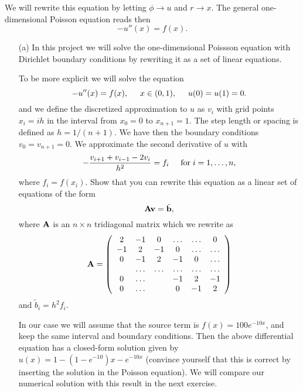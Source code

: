We will rewrite this equation by letting $\phi\rightarrow u$ and 
$r\rightarrow x$. 
The general one-dimensional Poisson equation reads then 
\[
-u''(x) = f(x).
\]


\begin{enumerate}
\item[(a)] 
In this project we will solve the one-dimensional Poissson equation
with Dirichlet boundary conditions by rewriting it as a set of linear equations.


To be more explicit we will solve the equation
\[
-u''(x) = f(x), \hspace{0.5cm} x\in(0,1), \hspace{0.5cm} u(0) = u(1) = 0.
\]
and we define the discretized approximation  to $u$ as $v_i$  with 
grid points $x_i=ih$   in the interval from $x_0=0$ to $x_{n+1}=1$.
The step length or spacing is defined as $h=1/(n+1)$. 
We have then the boundary conditions $v_0 = v_{n+1} = 0$.
We  approximate the second
derivative of $u$ with 
\[
   -\frac{v_{i+1}+v_{i-1}-2v_i}{h^2} = f_i  \hspace{0.5cm} \mathrm{for} \hspace{0.1cm} i=1,\dots, n,
\]
where $f_i=f(x_i)$.
Show that you can rewrite this equation as a linear set of equations of the form 
\[
   {\bf A}{\bf v} = \tilde{{\bf b}},
\]
where ${\bf A}$ is an $n\times n$  tridiagonal matrix which we rewrite as 
\begin{equation}
    {\bf A} = \left(\begin{array}{cccccc}
                           2& -1& 0 &\dots   & \dots &0 \\
                           -1 & 2 & -1 &0 &\dots &\dots \\
                           0&-1 &2 & -1 & 0 & \dots \\
                           & \dots   & \dots &\dots   &\dots & \dots \\
                           0&\dots   &  &-1 &2& -1 \\
                           0&\dots    &  & 0  &-1 & 2 \\
                      \end{array} \right)
\end{equation}
and $\tilde{b}_i=h^2f_i$.


In our case we will assume  that the source term is 
$f(x) = 100e^{-10x}$, and keep the same interval and boundary 
conditions. Then the above differential equation
has a closed-form  solution given by $u(x) = 1-(1-e^{-10})x-e^{-10x}$ (convince yourself that this is correct by inserting the
solution in the Poisson equation).  We will compare
our numerical solution with this result in the next exercise. 


\end{enumerate}
